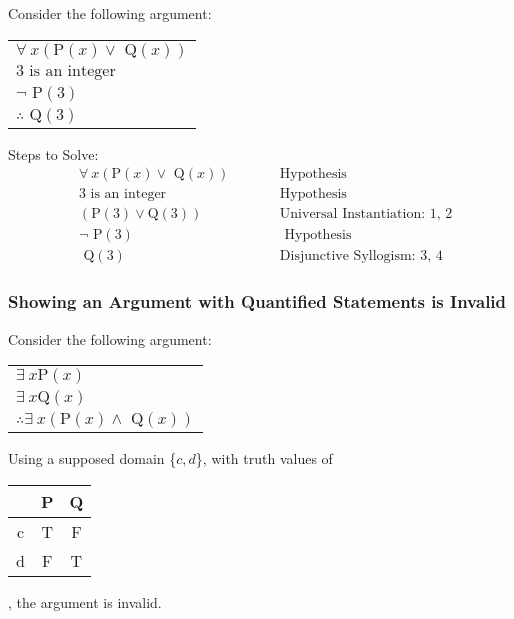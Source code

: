 Consider the following argument:
\begin{tabular}{l}
  $\forall~ x (\text{P}(x) \lor \text{ Q}(x))$ \\
  $3 \text{ is an integer}$                   \\
  $\lnot \text{ P}(3)$                        \\
  \hline
  $\therefore \text{ Q}(3)$
\end{tabular}

\begin{center}
  Steps to Solve:
  \begin{align}
     & \forall~ x (\text{P}(x) \lor \text{ Q}(x)) &  & \qquad \text{Hypothesis}                    \\
     & 3 \text{ is an integer}                   &  & \qquad \text{Hypothesis}                    \\
     & (\text{P}(3) \lor \text{Q}(3))            &  & \qquad \text{Universal Instantiation: 1, 2} \\
     & \lnot \text{ P}(3)                        &  & \qquad \text{ Hypothesis}                   \\
     & \text{ Q}(3)                              &  & \qquad \text{Disjunctive Syllogism: 3, 4}
  \end{align}
\end{center}

\subsubsection*{Showing an Argument with Quantified Statements is Invalid}

Consider the following argument:
\begin{tabular}{l}
  $\exists~ x \text{P}(x)$ \\
  $\exists~ x \text{Q}(x)$ \\
  \hline
  $\therefore \exists~ x (\text{P}(x) \land \text{ Q}(x))$
\end{tabular}

Using a supposed domain \{$c, d$\}, with truth values of
\begin{tabular}{c|cc}
    & P & Q \\
  \hline
  c & T & F \\
  d & F & T
\end{tabular},
the argument is invalid.